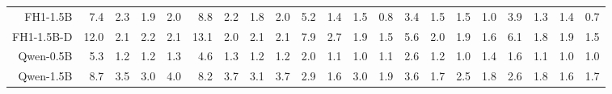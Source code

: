 \begin{table}[t]
{\begin{tabular}{rrrrr|rrrr|rrrr|rrrr|rrrr}
FH1-1.5B & \cellcolor[HTML]{FDE9CC}7.4 & \cellcolor[HTML]{F9D2CC}2.3 & \cellcolor[HTML]{F9D0CC}1.9 & \cellcolor[HTML]{F9D1CC}2.0 & \cellcolor[HTML]{FEEFCC}8.8 & \cellcolor[HTML]{F9D1CC}2.2 & \cellcolor[HTML]{F9D0CC}1.8 & \cellcolor[HTML]{F9D0CC}2.0 & \cellcolor[HTML]{FDF2CC}5.2 & \cellcolor[HTML]{F9D3CC}1.4 & \cellcolor[HTML]{F9D3CC}1.5 & \cellcolor[HTML]{F8CDCC}0.8 & \cellcolor[HTML]{FCE2CC}3.4 & \cellcolor[HTML]{FAD5CC}1.5 & \cellcolor[HTML]{FAD5CC}1.5 & \cellcolor[HTML]{F9D2CC}1.0 & \cellcolor[HTML]{FDE8CC}3.9 & \cellcolor[HTML]{F9D3CC}1.3 & \cellcolor[HTML]{FAD5CC}1.4 & \cellcolor[HTML]{F9CFCC}0.7 \\
FH1-1.5B-D & \cellcolor[HTML]{EFEFCC}12.0 & \cellcolor[HTML]{F9D1CC}2.1 & \cellcolor[HTML]{F9D1CC}2.2 & \cellcolor[HTML]{F9D1CC}2.1 & \cellcolor[HTML]{EAEECC}13.1 & \cellcolor[HTML]{F9D0CC}2.0 & \cellcolor[HTML]{F9D1CC}2.1 & \cellcolor[HTML]{F9D1CC}2.1 & \cellcolor[HTML]{DDEBCC}7.9 & \cellcolor[HTML]{FBDECC}2.7 & \cellcolor[HTML]{FAD7CC}1.9 & \cellcolor[HTML]{F9D3CC}1.5 & \cellcolor[HTML]{FEF2CC}5.6 & \cellcolor[HTML]{FAD8CC}2.0 & \cellcolor[HTML]{FAD8CC}1.9 & \cellcolor[HTML]{FAD6CC}1.6 & \cellcolor[HTML]{F3F0CC}6.1 & \cellcolor[HTML]{FAD7CC}1.8 & \cellcolor[HTML]{FAD8CC}1.9 & \cellcolor[HTML]{FAD5CC}1.5 \\
Qwen-0.5B & \cellcolor[HTML]{FCE0CC}5.3 & \cellcolor[HTML]{F8CDCC}1.2 & \cellcolor[HTML]{F8CDCC}1.2 & \cellcolor[HTML]{F8CDCC}1.3 & \cellcolor[HTML]{FBDCCC}4.6 & \cellcolor[HTML]{F8CDCC}1.3 & \cellcolor[HTML]{F8CDCC}1.2 & \cellcolor[HTML]{F8CDCC}1.2 & \cellcolor[HTML]{FAD7CC}2.0 & \cellcolor[HTML]{F9CFCC}1.1 & \cellcolor[HTML]{F8CECC}1.0 & \cellcolor[HTML]{F9D0CC}1.1 & \cellcolor[HTML]{FBDDCC}2.6 & \cellcolor[HTML]{F9D3CC}1.2 & \cellcolor[HTML]{F9D2CC}1.0 & \cellcolor[HTML]{FAD5CC}1.4 & \cellcolor[HTML]{FAD5CC}1.6 & \cellcolor[HTML]{F9D2CC}1.1 & \cellcolor[HTML]{F9D1CC}1.0 & \cellcolor[HTML]{F9D1CC}1.0 \\
Qwen-1.5B & \cellcolor[HTML]{FEEFCC}8.7 & \cellcolor[HTML]{FAD7CC}3.5 & \cellcolor[HTML]{FAD5CC}3.0 & \cellcolor[HTML]{FADACC}4.0 & \cellcolor[HTML]{FEECCC}8.2 & \cellcolor[HTML]{FAD8CC}3.7 & \cellcolor[HTML]{FAD5CC}3.1 & \cellcolor[HTML]{FAD8CC}3.7 & \cellcolor[HTML]{FCDFCC}2.9 & \cellcolor[HTML]{F9D4CC}1.6 & \cellcolor[HTML]{FCE1CC}3.0 & \cellcolor[HTML]{FAD7CC}1.9 & \cellcolor[HTML]{FCE4CC}3.6 & \cellcolor[HTML]{FAD7CC}1.7 & \cellcolor[HTML]{FBDDCC}2.5 & \cellcolor[HTML]{FAD7CC}1.8 & \cellcolor[HTML]{FBDECC}2.6 & \cellcolor[HTML]{FAD8CC}1.8 & \cellcolor[HTML]{FAD5CC}1.6 & \cellcolor[HTML]{FAD6CC}1.7 \\

\end{tabular}}
\end{table}

